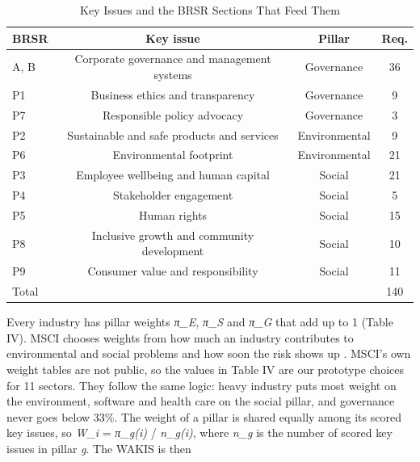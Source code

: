 \documentclass[conference]{IEEEtran}
\begin{document}
\begin{table}[!t]\centering\caption{Key Issues and the BRSR Sections That Feed Them}
\footnotesize\begin{tabular}{lccc}\toprule
BRSR & Key issue & Pillar & Req. \\ \midrule
A, B & Corporate governance and management systems & Governance & 36 \\
P1 & Business ethics and transparency & Governance & 9 \\
P7 & Responsible policy advocacy & Governance & 3 \\
P2 & Sustainable and safe products and services & Environmental & 9 \\
P6 & Environmental footprint & Environmental & 21 \\
P3 & Employee wellbeing and human capital & Social & 21 \\
P4 & Stakeholder engagement & Social & 5 \\
P5 & Human rights & Social & 15 \\
P8 & Inclusive growth and community development & Social & 10 \\
P9 & Consumer value and responsibility & Social & 11 \\
Total &  &  & 140 \\
\bottomrule\end{tabular}
\end{table}
Every industry has pillar weights \textit{π\_E}, \textit{π\_S} and \textit{π\_G} that add up to 1 (Table IV). MSCI chooses weights from how much an industry contributes to environmental and social problems and how soon the risk shows up \cite{b4}. MSCI's own weight tables are not public, so the values in Table IV are our prototype choices for 11 sectors. They follow the same logic: heavy industry puts most weight on the environment, software and health care on the social pillar, and governance never goes below 33\%. The weight of a pillar is shared equally among its scored key issues, so \textit{W\_i} = \textit{π\_g(i)} / \textit{n\_g(i)}, where \textit{n\_g} is the number of scored key issues in pillar \textit{g}. The WAKIS is then
\end{document}

